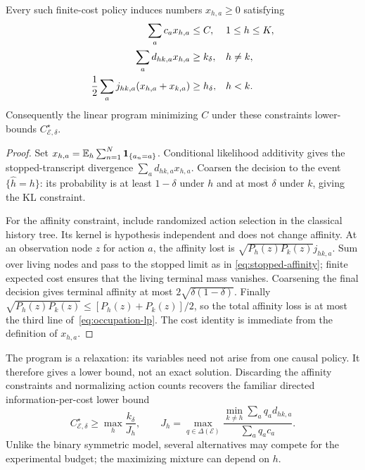 \begin{theorem}
\label{thm:occupation-converse}
Every such finite-cost policy induces numbers $x_{h,a}\geq0$ satisfying
\begin{align}
 \sum_a c_ax_{h,a}&\leq C, &&1\leq h\leq K,\notag\\
 \sum_a d_{hk,a}x_{h,a}&\geq k_\delta, &&h\ne k,\label{eq:occupation-lp}\\
 \frac12\sum_a j_{hk,a}(x_{h,a}+x_{k,a})&\geq h_\delta,
 &&h<k.\notag
\end{align}
Consequently the linear program minimizing $C$ under these constraints
lower-bounds $C_{\mathcal E,\delta}^\star$.
\end{theorem}
\begin{proof}
Set $x_{h,a}=\mathbb E_h\sum_{n=1}^N\mathbf1_{\{a_n=a\}}$.
Conditional likelihood additivity gives the stopped-transcript
divergence $\sum_ad_{hk,a}x_{h,a}$. Coarsen the decision to the event
$\{\widehat h=h\}$: its probability is at least $1-\delta$ under $h$
and at most $\delta$ under $k$, giving the KL constraint.

For the affinity constraint, include randomized action selection in
the classical history tree. Its kernel is hypothesis independent and
does not change affinity. At an observation node $z$ for action $a$,
the affinity lost is
$\sqrt{P_h(z)P_k(z)}j_{hk,a}$.
Sum over living nodes and pass to the stopped limit as in
\eqref{eq:stopped-affinity}; finite expected cost ensures that the
living terminal mass vanishes. Coarsening the final decision gives
terminal affinity at most $2\sqrt{\delta(1-\delta)}$.
Finally $\sqrt{P_h(z)P_k(z)}\leq[P_h(z)+P_k(z)]/2$, so the total
affinity loss is at most the third line of~\eqref{eq:occupation-lp}.
The cost identity is immediate from the definition of $x_{h,a}$.
\end{proof}

The program is a relaxation: its variables need not arise from one
causal policy. It therefore gives a lower bound, not an exact solution.
Discarding the affinity constraints and normalizing action counts
recovers the familiar directed information-per-cost lower bound
\[
 C_{\mathcal E,\delta}^\star\geq
 \max_h\frac{k_\delta}{J_h},\qquad
 J_h=\max_{q\in\Delta(\mathcal E)}
 \frac{\min_{k\ne h}\sum_aq_ad_{hk,a}}{\sum_aq_ac_a}.
\]
Unlike the binary symmetric model, several alternatives may compete
for the experimental budget; the maximizing mixture can depend on $h$.

